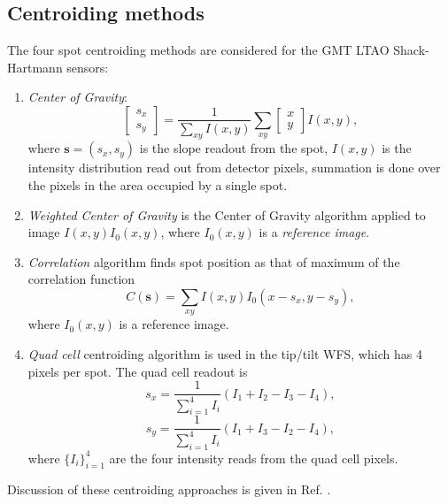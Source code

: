 \subsection{Centroiding methods}
\label{subsec:sh-wfs-centroid}

The four spot centroiding methods are considered for the GMT LTAO Shack-Hartmann
sensors:
\begin{enumerate}
	\item \emph{Center of Gravity}: 
	\begin{equation} \label{eq:CoG}
	\left[ \begin{array}{c} s_{x} \\ s_{y} \end{array} \right] =
	\frac{1}{\sum_{xy} I(x,y)}
	\sum_{xy} \left[ \begin{array}{c} x \\ y \end{array} \right] I(x,y),
	\end{equation}
	where $\bm{s} = (s_{x},s_{y})$ is the slope readout from the spot,
	$I(x,y)$ is the intensity distribution read out from detector pixels,
	summation is done over the pixels in the area occupied by a single spot.
	\item \emph{Weighted Center of Gravity}  is the Center of Gravity algorithm
	applied to image $I(x,y) I_{0}(x,y)$, where $I_{0}(x,y)$ is a
	\emph{reference image}. 
	\item \emph{Correlation}  algorithm finds spot
	position as that of maximum of the correlation function
	\begin{equation} \label{eq:corr}
		C(\bm{s}) = \sum_{xy} I(x,y) I_{0}(x-s_{x},y-s_{y}),
	\end{equation}
	where $I_{0}(x,y)$ is a reference image.
	\item \emph{Quad cell}  centroiding algorithm is used in
	the tip/tilt WFS, which has 4 pixels per spot. The quad cell readout is
	\begin{equation} \label{eq:quad-cell}
		s_{x} = \frac{1}{\sum_{i=1}^{4} I_{i}} (I_{1} + I_{2} - I_{3} - I_{4}),
	\end{equation}
	$$
		s_{y} = \frac{1}{\sum_{i=1}^{4} I_{i}} (I_{1} + I_{3} - I_{2} - I_{4}),
	$$
	where $\{ I_{i} \}_{i=1}^{4}$ are the four intensity reads from the quad
	cell pixels.
\end{enumerate}
Discussion of these centroiding approaches is given in Ref.
\cite{ConanCentroid}.

